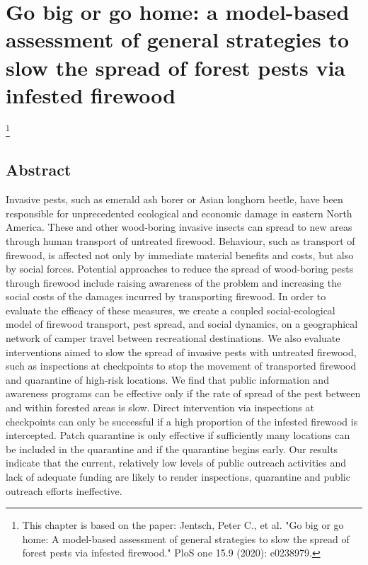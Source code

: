 \chapter{Go big or go home: a model-based assessment of general strategies to slow the spread of forest pests via infested firewood}
\label{firewoodmodel}
\let\thefootnote\relax\footnote{This chapter is based on the paper: Jentsch, Peter C., et al. "Go big or go home: A model-based assessment of general strategies to slow the spread of forest pests via infested firewood." PloS one 15.9 (2020): e0238979.}
\vspace*{0.2in}

\section{Abstract}
Invasive pests, such as emerald ash borer or Asian longhorn beetle, have been responsible for unprecedented ecological and economic damage in eastern North America. These and other wood-boring invasive insects can spread to new areas through human transport of untreated firewood. Behaviour, such as transport of firewood, is affected not only by immediate material benefits and costs, but also by social forces. Potential approaches to reduce the spread of wood-boring pests through firewood include raising awareness of the problem and increasing the social costs of the damages incurred by transporting firewood. In order to evaluate the efficacy of these measures, we create a coupled social-ecological model of firewood transport, pest spread, and social dynamics, on a geographical network of camper travel between recreational destinations. We also evaluate interventions aimed to slow the spread of invasive pests with untreated firewood, such as inspections at checkpoints to stop the movement of transported firewood and quarantine of high-risk locations. We find that public information and awareness programs can be effective only if the rate of spread of the pest between and within forested areas is slow. Direct intervention via inspections at checkpoints can only be successful if a high proportion of the infested firewood is intercepted. Patch quarantine is only effective if sufficiently many locations can be included in the quarantine and if the quarantine begins early. Our results indicate that the current, relatively low levels of public outreach activities and lack of adequate funding are likely to render inspections, quarantine and public outreach efforts ineffective.


